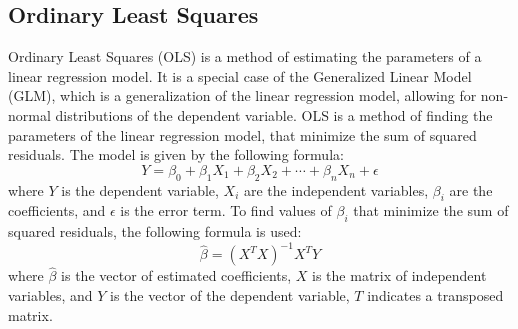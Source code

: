 \documentclass[12pt]{report}
\begin{document}
\subsection{Ordinary Least Squares}
Ordinary Least Squares (OLS) is a method of estimating the parameters of a linear regression model. It is a special case of the Generalized Linear Model (GLM), which is a generalization of the linear regression model, allowing for non-normal distributions of the dependent variable. OLS is a method of finding the parameters of the linear regression model, that minimize the sum of squared residuals. The model is given by the following formula:
\begin{equation}
	Y = \beta_0 + \beta_1 X_1 + \beta_2 X_2 + \cdots + \beta_n X_n + \epsilon
\end{equation}
where $Y$ is the dependent variable, $X_i$ are the independent variables, $\beta_i$ are the coefficients, and $\epsilon$ is the error term. To find values of \(\beta_i\) that minimize the sum of squared residuals, the following formula is used:
\begin{equation}
    \hat{\beta} = {(X^T X)}^{-1} X^T Y
\end{equation}
where $\hat{\beta}$ is the vector of estimated coefficients, $X$ is the matrix of independent variables, and $Y$ is the vector of the dependent variable, $T$ indicates a transposed matrix.
\end{document}
